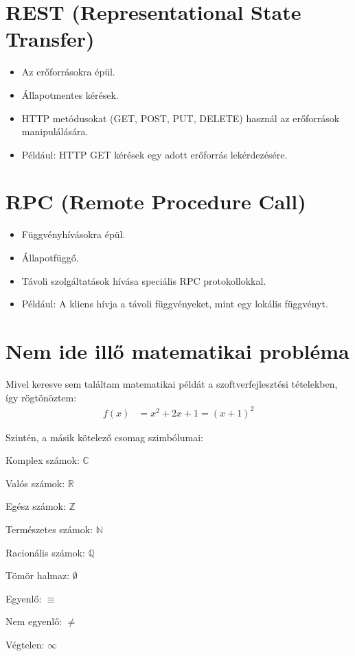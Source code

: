 \documentclass{report}
\begin{document}
				\section*{REST (Representational State Transfer)}
					\begin{itemize}
					    \item Az erőforrásokra épül.
					    \item Állapotmentes kérések.
					    \item HTTP metódusokat (GET, POST, PUT, DELETE) használ az erőforrások manipulálására.
					    \item Például: HTTP GET kérések egy adott erőforrás lekérdezésére.
					\end{itemize}
				
				\section*{RPC (Remote Procedure Call)}
					\begin{itemize}
					    \item Függvényhívásokra épül.
					    \item Állapotfüggő.
					    \item Távoli szolgáltatások hívása speciális RPC protokollokkal.
					    \item Például: A kliens hívja a távoli függvényeket, mint egy lokális függvényt.
					\end{itemize}




		\section{Nem ide illő matematikai probléma}
			Mivel keresve sem találtam matematikai példát a szoftverfejlesztési tételekben, így rögtönöztem:
			\begin{align}
			    f(x) &= x^2 + 2x + 1 = (x + 1)^2
			\end{align}
			
		
			Szintén, a másik kötelező csomag szimbólumai:
			\begin{description}
				    \item Komplex számok: $\mathbb{C}$
				    \item Valós számok: $\mathbb{R}$
				    \item Egész számok: $\mathbb{Z}$
				    \item Természetes számok: $\mathbb{N}$
				    \item Racionális számok: $\mathbb{Q}$
				    \item Tömör halmaz: $\emptyset$
				    \item Egyenlő: $\equiv$
				    \item Nem egyenlő: $\neq$
				    \item Végtelen: $\infty$

			\end{description}
			
\end{document}
